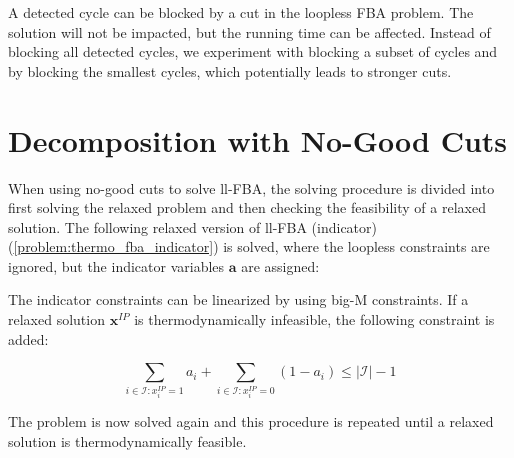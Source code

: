 A detected cycle can be blocked by a cut in the loopless FBA problem. The solution will not be impacted, but the running time can be affected. 
Instead of blocking all detected cycles, we experiment with blocking a subset of cycles and by blocking the smallest cycles, which potentially leads to stronger cuts. 

\newpage
\section{Decomposition with No-Good Cuts} \label{section:no_good_cuts}
When using no-good cuts to solve ll-FBA, the solving procedure is divided into first solving the relaxed problem and then checking the feasibility of a relaxed solution. 
The following relaxed version of \textsf{ll-FBA (indicator)} (\cref{problem:thermo_fba_indicator}) is solved, where the loopless constraints are ignored, but the indicator variables $\boldsymbol a$ are assigned:
\vspace*{-\baselineskip}

The indicator constraints can be linearized by using big-M constraints.
If a relaxed solution $\mathbf x^{IP}$ is thermodynamically infeasible, the following constraint is added:

\begin{equation} \label{noGoodCut}
\sum_{i \in \mathcal{I}: x_i^{IP}=1} a_i + \sum_{i \in \mathcal{I}: x_i^{IP}=0} (1-a_i) \leq |\mathcal{I}|-1
\end{equation}

The problem is now solved again and this procedure is repeated until a relaxed solution is thermodynamically feasible. 

